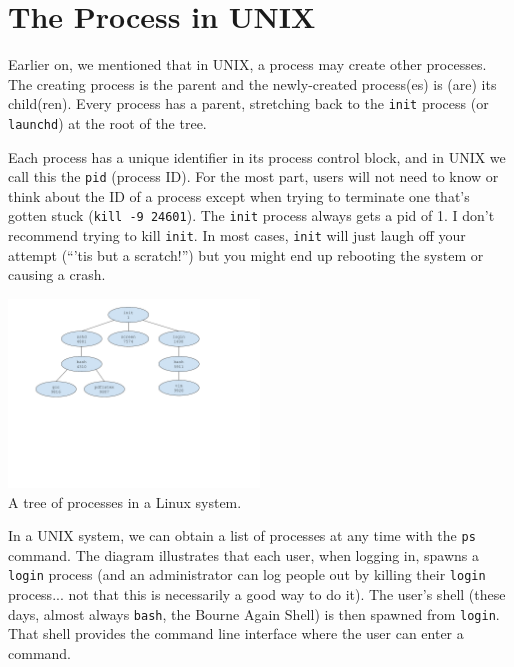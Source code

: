 




\section*{The Process in UNIX}

Earlier on, we mentioned  that in UNIX, a process may create other processes. The creating process is the parent and the newly-created process(es) is (are) its child(ren). Every process has a parent, stretching back to the \texttt{init} process (or \texttt{launchd}) at the root of the tree.

Each process has a unique identifier in its process control block, and in UNIX we call this the \texttt{pid} (process ID). For the most part, users will not need to know or think about the ID of a process except when trying to terminate one that's gotten stuck (\texttt{kill -9 24601}). The \texttt{init} process always gets a pid of 1. I don't recommend trying to kill \texttt{init}. In most cases, \texttt{init} will just laugh off your attempt (``'tis but a scratch!'') but you might end up rebooting the system or causing a crash.

\begin{center}
\includegraphics[width=0.5\textwidth]{images/linux-process-tree.pdf}\\
A tree of processes in a Linux system.
\end{center}

In a UNIX system, we can obtain a list of processes at any time with the \texttt{ps} command. The diagram illustrates that each user, when logging in, spawns a \texttt{login} process (and an administrator can log people out by killing their \texttt{login} process... not that this is necessarily a good way to do it). The user's shell (these days, almost always \texttt{bash}, the Bourne Again Shell) is then spawned from \texttt{login}. That shell provides the command line interface where the user can enter a command.

